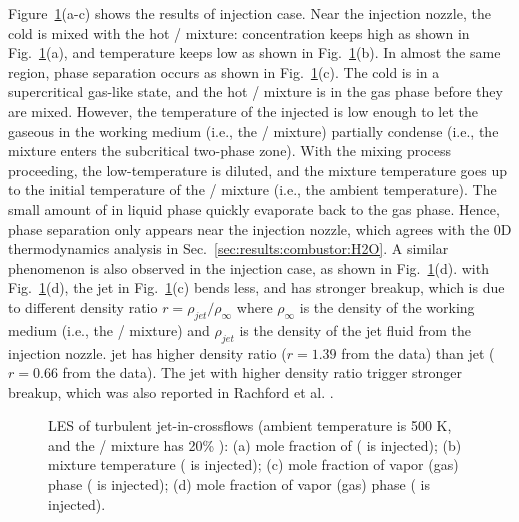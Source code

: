 Figure~\ref{JICFr}(a-c) shows the results of  injection case. Near the injection nozzle, the cold  is mixed with the hot / mixture:  concentration keeps high as shown in Fig.~\ref{JICFr}(a), and temperature keeps low as shown in Fig.~\ref{JICFr}(b). In almost the same region, phase separation occurs as shown in Fig.~\ref{JICFr}(c). The cold  is in a supercritical gas-like state, and the hot / mixture is in the gas phase before they are mixed. However, the temperature of the injected  is low enough to let the gaseous  in the working medium (i.e., the / mixture) partially condense (i.e., the mixture enters the subcritical two-phase zone). %
With the mixing process proceeding, the low-temperature  is diluted, and the mixture temperature goes up to the initial temperature of the / mixture (i.e., the ambient temperature). The small amount of  in liquid phase quickly evaporate back to the gas phase. Hence, phase separation only appears near the injection nozzle, which agrees with the 0D thermodynamics analysis in Sec.~\ref{sec:results:combustor:H2O}. A similar phenomenon is also observed in the  injection case, as shown in Fig.~\ref{JICFr}(d).  with Fig.~\ref{JICFr}(d), the jet in Fig.~\ref{JICFr}(c) bends less, and has stronger breakup, which is due to different density ratio $r=\rho_{jet}/\rho_{\infty}$ where $\rho_{\infty}$ is the density of the working medium (i.e., the / mixture) and $\rho_{jet}$ is the density of the jet fluid from the injection nozzle.  jet has higher density ratio ($r=1.39$ from the data) than  jet ($r=0.66$ from the data). The jet with higher density ratio trigger stronger breakup, which was also reported in Rachford et al. \cite{tretola2021effect}.

\begin{figure}[htb]
    \centering

    \caption{LES of turbulent jet-in-crossflows (ambient temperature is 500 K, and the / mixture has 20\% ): (a) mole fraction of  ( is injected); (b) mixture temperature ( is injected); (c) mole fraction of vapor (gas) phase ( is injected); (d) mole fraction of vapor (gas) phase ( is injected).}
    \label{JICFr}
\end{figure}

